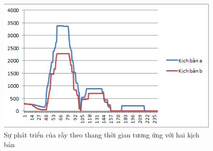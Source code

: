 \documentclass[13pt]{extreport}
\begin{document}
{\begin{figure}%
\begin{center}
\includegraphics[scale=1]{2kb}
\end{center}
\caption{\small Sự phát triển của rầy theo thang thời gian tương ứng với hai kịch bản }
\end{figure}

}
\end{document}
